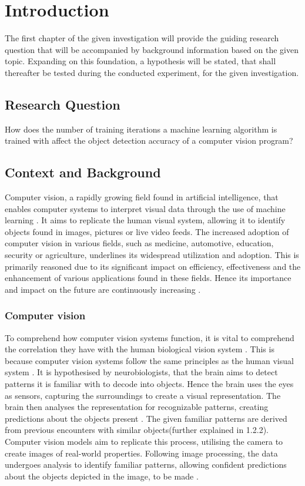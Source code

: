 

\section{Introduction}
The first chapter of the given investigation will provide the guiding research question that will be accompanied by background information based on the given topic. Expanding on this foundation, a hypothesis will be stated, that shall thereafter be tested during the conducted experiment, for the given investigation.

\subsection{Research Question}
How does the number of training iterations a machine learning algorithm is trained with affect the object detection accuracy of a computer vision program?

\subsection{Context and Background}
Computer vision, a rapidly growing field found in artificial intelligence, that enables computer systems to interpret visual data through the use of machine learning \parencite{Sultana2020}. It aims to replicate the human visual system, allowing it to identify objects found in images, pictures or live video feeds. The increased adoption of computer vision in various fields, such as medicine, automotive, education, security or agriculture, underlines its widespread utilization and adoption. This is primarily reasoned due to its significant impact on efficiency, effectiveness and the enhancement of various applications found in these fields. Hence its importance and impact on the future are continuously increasing \parencite{Szeliski2022}. 

\subsubsection{Computer vision}
To comprehend how computer vision systems function, it is vital to comprehend the correlation they have with the human biological vision system \parencite{DiCarlo2012}. This is because computer vision systems follow the same principles as the human visual system \parencite{Voulodimos2018}. It is hypothesised by neurobiologists, that the brain aims to detect patterns it is familiar with to decode into objects. Hence the brain uses the eyes as sensors, capturing the surroundings to create a visual representation. The brain then analyses the representation for recognizable patterns, creating predictions about the objects present . The given familiar patterns are derived from previous encounters with similar objects(further explained in 1.2.2). Computer vision models aim to replicate this process, utilising the camera to create images of real-world properties. Following image processing, the data undergoes analysis to identify familiar patterns, allowing confident predictions about the objects depicted in the image, to be made \parencite{Jahne2000}.

